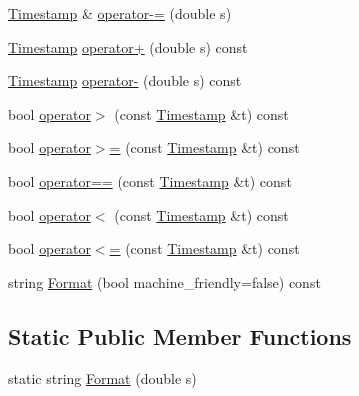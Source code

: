 \begin{DoxyCompactItemize}
\item 
\hyperlink{classDUtils_1_1Timestamp}{Timestamp} \& \hyperlink{classDUtils_1_1Timestamp_a775ece4a7fab156430da57da985a8965}{operator-\/=} (double s)
\item 
\hyperlink{classDUtils_1_1Timestamp}{Timestamp} \hyperlink{classDUtils_1_1Timestamp_a12ecf62650e5582707cf9fb30f1b2d87}{operator+} (double s) const
\item 
\hyperlink{classDUtils_1_1Timestamp}{Timestamp} \hyperlink{classDUtils_1_1Timestamp_adfccd22d119468b931e7144ceb9d08da}{operator-\/} (double s) const
\item 
bool \hyperlink{classDUtils_1_1Timestamp_ad77ef43cab29f8f588bd47d74c1a8cce}{operator$>$} (const \hyperlink{classDUtils_1_1Timestamp}{Timestamp} \&t) const
\item 
bool \hyperlink{classDUtils_1_1Timestamp_ade494d1dad26c52bf93c189342a1a69a}{operator$>$=} (const \hyperlink{classDUtils_1_1Timestamp}{Timestamp} \&t) const
\item 
bool \hyperlink{classDUtils_1_1Timestamp_a42280e1193a6af2ac41362cf18a1185c}{operator==} (const \hyperlink{classDUtils_1_1Timestamp}{Timestamp} \&t) const
\item 
bool \hyperlink{classDUtils_1_1Timestamp_a5ec33cb0b7230946e02e4afa050c445c}{operator$<$} (const \hyperlink{classDUtils_1_1Timestamp}{Timestamp} \&t) const
\item 
bool \hyperlink{classDUtils_1_1Timestamp_a4fe0620f1df3aaa4d30ce9a8ba989f77}{operator$<$=} (const \hyperlink{classDUtils_1_1Timestamp}{Timestamp} \&t) const
\item 
string \hyperlink{classDUtils_1_1Timestamp_ad2ce60eeec43f9fa86379ed8b269ab64}{Format} (bool machine\+\_\+friendly=false) const
\end{DoxyCompactItemize}
\subsection*{Static Public Member Functions}
\begin{DoxyCompactItemize}
\item 
static string \hyperlink{classDUtils_1_1Timestamp_abd63d0a2abc2209f9300296ee3e85265}{Format} (double s)
\end{DoxyCompactItemize}
